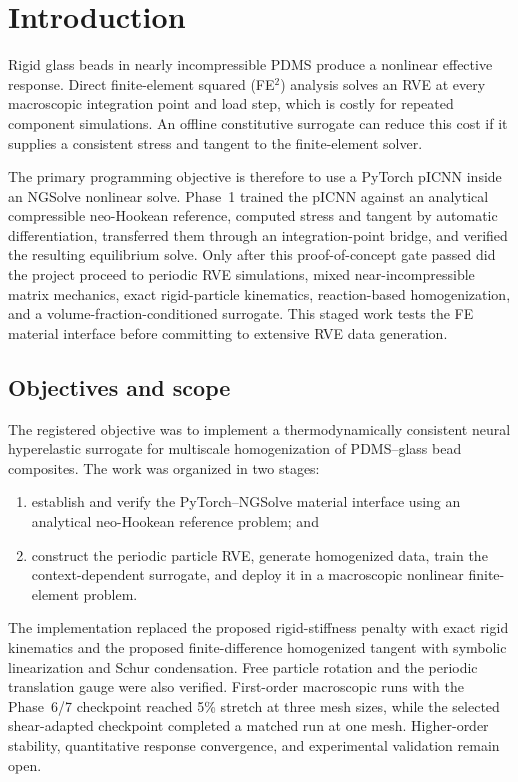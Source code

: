 \chapter{Introduction}
\label{ch:introduction}

Rigid glass beads in nearly incompressible PDMS produce a nonlinear effective
response. Direct finite-element squared (FE\(^2\)) analysis solves an RVE at
every macroscopic integration point and load step, which is costly for repeated
component simulations. An offline constitutive surrogate can reduce this cost
if it supplies a consistent stress and tangent to the finite-element solver.

The primary programming objective is therefore to use a PyTorch pICNN inside
an NGSolve nonlinear solve. Phase~1 trained the pICNN against an analytical
compressible neo-Hookean reference, computed stress and tangent by automatic
differentiation, transferred them through an integration-point bridge, and
verified the resulting equilibrium solve. Only after this proof-of-concept
gate passed did the project proceed to periodic RVE simulations, mixed
near-incompressible matrix mechanics, exact rigid-particle kinematics,
reaction-based homogenization, and a volume-fraction-conditioned surrogate.
This staged work tests the FE material interface before committing to
extensive RVE data generation.

\section{Objectives and scope}

The registered objective was to implement a thermodynamically consistent
neural hyperelastic surrogate for multiscale homogenization of PDMS--glass
bead composites. The work was organized in two stages:
\begin{enumerate}
  \item establish and verify the PyTorch--NGSolve material interface using an
        analytical neo-Hookean reference problem; and
  \item construct the periodic particle RVE, generate homogenized data, train
        the context-dependent surrogate, and deploy it in a macroscopic
        nonlinear finite-element problem.
\end{enumerate}

The implementation replaced the proposed rigid-stiffness penalty with exact
rigid kinematics and the proposed finite-difference homogenized tangent with
symbolic linearization and Schur condensation. Free particle rotation and the
periodic translation gauge were also verified. First-order macroscopic runs
with the Phase~6/7 checkpoint reached 5\% stretch at three mesh sizes, while
the selected shear-adapted checkpoint completed a matched run at one mesh.
Higher-order stability, quantitative response convergence, and experimental
validation remain open.

